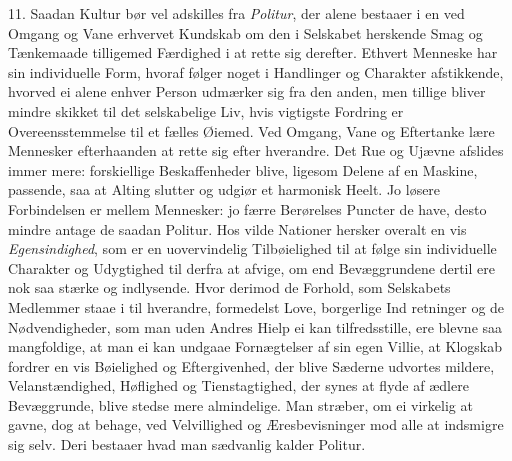 \documentclass[12pt,a4paper]{article}
\newcommand{\opage}[1]{\marginnote{\footnotesize\textit{[#1]}}}
\begin{document}
11. Saadan Kultur bør vel adskilles fra \emph{Politur}, der alene bestaaer i en ved Omgang
og Vane erhvervet Kundskab om den i Selskabet herskende Smag og Tænkemaade tilligemed
Færdighed i at rette sig derefter. Ethvert Menneske har sin individuelle Form, hvoraf
følger noget i Handlinger og Charakter afstikkende, hvorved ei alene enhver Person
udmærker sig fra den anden, men tillige bliver mindre skikket til det selskabelige Liv,
hvis vigtigste Fordring er Overeensstemmelse til et fælles Øiemed. Ved Omgang, Vane og
Eftertanke lære Mennesker efterhaanden at rette sig efter hverandre. Det Rue og Ujævne
afslides immer mere: forskiellige Beskaffenheder blive, ligesom Delene af en Maskine,
passende, saa at Alting slutter og udgiør et harmonisk Heelt. Jo løsere Forbindelsen er
mellem Mennesker: jo færre Berørelses Puncter de have, desto mindre antage de saadan
Politur. Hos vilde Nationer hersker overalt en vis \emph{Egensindighed}, som er en
uovervindelig Tilbøielighed til at følge sin individuelle Charakter og Udygtighed til
derfra at afvige, om end Bevæggrundene dertil ere nok saa stærke og indlysende. Hvor
derimod de Forhold, som Selskabets Medlemmer staae i til hverandre, formedelst Love,
borgerlige Ind%
\opage{179}retninger og de Nødvendigheder, som man uden Andres Hielp ei kan tilfredsstille, ere
blevne saa mangfoldige, at man ei kan undgaae Fornægtelser af sin egen Villie, at Klogskab
fordrer en vis Bøielighed og Eftergivenhed, der blive Sæderne udvortes mildere,
Velanstændighed, Høflighed og Tienstagtighed, der synes at flyde af ædlere Bevæggrunde,
blive stedse mere almindelige. Man stræber, om ei virkelig at gavne, dog at behage, ved
Velvillighed og Æresbevisninger mod alle at indsmigre sig selv. Deri bestaaer hvad man
sædvanlig kalder Politur.
\end{document}
